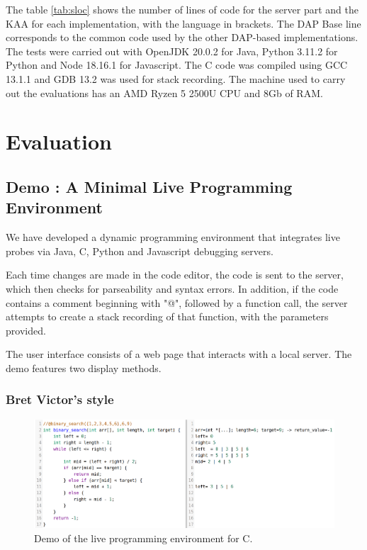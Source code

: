 \documentclass[english,submission]{programming}
\begin{document}
The table \ref{tab:sloc} shows the number of lines of code for the server part and the KAA for each implementation, with the language in brackets. The DAP Base line corresponds to the common code used by the other DAP-based implementations.
The tests were carried out with OpenJDK 20.0.2 for Java, Python 3.11.2 for Python and Node 18.16.1 for Javascript. The C code was compiled using GCC 13.1.1 and GDB 13.2 was used for stack recording. The machine used to carry out the evaluations has an AMD Ryzen 5 2500U CPU and 8Gb of RAM.

\section{Evaluation}
\label{sec:evaluation}
\subsection{Demo : A Minimal Live Programming Environment}
\label{sec:demo-small-c}


We have developed a dynamic programming environment that integrates live probes via Java, C, Python and Javascript debugging servers. 

Each time changes are made in the code editor, the code is sent to the server, which then checks for parseability and syntax errors. 
In addition, if the code contains a comment beginning with "@", followed by a function call, the server attempts to create a stack recording of that function, with the parameters provided. 

The user interface consists of a web page that interacts with a local server. The demo features two display methods. 

\subsubsection{Bret Victor's style}
\label{sec:bret-victor-style}
\begin{figure}[htbp]
  \centering
  \includegraphics[width=\linewidth]{img/demo/c.png}
  \caption{Demo of the live programming environment for C.}
  \label{fig:demo}
\end{figure}
\end{document}
